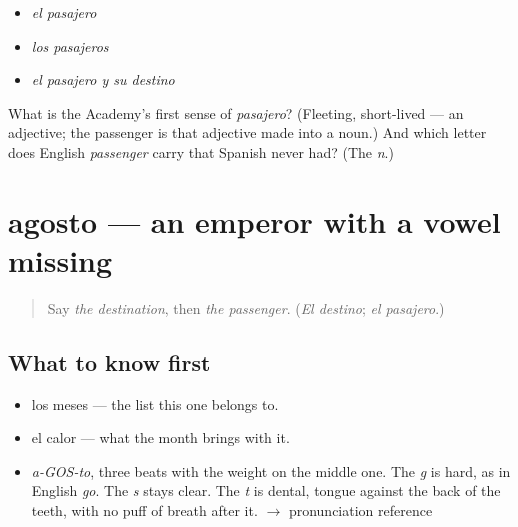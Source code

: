 \begin{itemize}
\raggedright
  \item \emph{el pasajero}
  \item \emph{los pasajeros}
  \item \emph{el pasajero y su destino}
\end{itemize}

\begin{tcolorbox}[breakable,colback=teal!4,colframe=teal!35!black,title={Before you move on}]
What is the Academy's first sense of \emph{pasajero}? (Fleeting, short-lived — an adjective; the passenger is that adjective made into a noun.) And which letter does English \emph{passenger} carry that Spanish never had? (The \emph{n}.)
\end{tcolorbox}
\section[agosto]{agosto — an emperor with a vowel missing}

\label{lesson:ES-C392-agosto}



\begin{quote}
Say \emph{the destination}, then \emph{the passenger}. (\emph{El destino}; \emph{el pasajero}.)
\end{quote}

\subsection*{What to know first}
\begin{itemize}
\raggedright
  \item los meses — the list this one belongs to.
  \item el calor — what the month brings with it.
\end{itemize}

\begin{sounds}
\begin{itemize}
\raggedright
  \item \emph{a-GOS-to}, three beats with the weight on the middle one. The \emph{g} is hard, as in English \emph{go}. The \emph{s} stays clear. The \emph{t} is dental, tongue against the back of the teeth, with no puff of breath after it. $\to$ pronunciation reference
\end{itemize}
\end{sounds}

